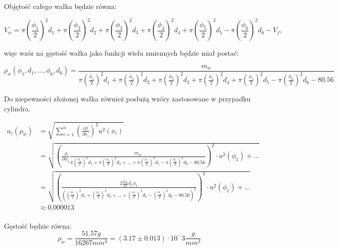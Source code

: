 Objętość całego wałka będzie równa:

$$V_w = \pi \left(\frac{\phi_1}{2}\right)^2 d_1 + \pi \left(\frac{\phi_2}{2}\right)^2 d_2 + \pi \left(\frac{\phi_3}{2}\right)^2 d_3 + \pi \left(\frac{\phi_4}{2}\right)^2 d_4 + \pi \left(\frac{\phi_5}{2}\right)^2 d_5 - \pi \left(\frac{\phi_6}{2}\right)^2 d_6 - V_f \textrm{,}$$

więc wzór na gęstość wałka jako funkcji wielu zmiennych będzie miał postać:

$$\rho_w(\phi_1, d_1, ..., \phi_6, d_6) = \frac{m_w}{\pi \left(\frac{\phi_1}{2}\right)^2 d_1 + \pi \left(\frac{\phi_2}{2}\right)^2 d_2 + \pi \left(\frac{\phi_3}{2}\right)^2 d_3 + \pi \left(\frac{\phi_4}{2}\right)^2 d_4 + \pi \left(\frac{\phi_5}{2}\right)^2 d_5 - \pi \left(\frac{\phi_6}{2}\right)^2 d_6 - 80.56}$$

Do niepewności złożonej wałka również posłużą wzóry zastosowane w przypadku cylindra.

\begin{equation*}
    \begin{aligned}
        u_c(\rho_w) &= \sqrt{\displaystyle\sum_{i=1}^{n} \left( \frac{\partial f}{\partial x_i} \right)^2 u^2(x_i)} \\
        &= \sqrt{ \left(\frac{\partial}{\partial \phi_1} \frac{m_w}{\pi \left(\frac{\phi_1}{2}\right)^2 d_1 + \pi \left(\frac{\phi_2}{2}\right)^2 d_2 + ... + \pi \left(\frac{\phi_5}{2}\right)^2 d_5 - \pi \left(\frac{\phi_6}{2}\right)^2 d_6 - 80.56} \right)^2 \cdot u^2(\phi_1) + ...} \\
        &= \sqrt{ \left(\frac{2\frac{m_w}{2\pi}d_1 \phi_1}{\left(\left(\frac{\phi_1}{2}\right)^2 d_1 + \left(\frac{\phi_2}{2}\right)^2 d_2 + ... + \left(\frac{\phi_5}{2}\right)^2 d_5 - \left(\frac{\phi_6}{2}\right)^2 d_6 - 80.56 \right)^2 }\right)^2 \cdot u^2(\phi_1) + ... } \\
        &\approx 0.000013
    \end{aligned}
\end{equation*} \\

Gęstość będzie równa: \\

$$\rho_w = \frac{51.57g}{16267mm^3} = (3.17 \pm 0.013) \cdot 10^-3 \frac{g}{mm^3}$$
